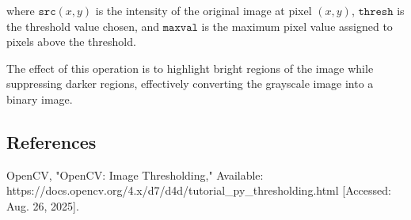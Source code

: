 \documentclass[10pt,twocolumn,letterpaper]{article}
\begin{document}
where $\texttt{src}(x,y)$ is the intensity of the original image at
pixel $(x,y)$, $\texttt{thresh}$ is the threshold value chosen, and
$\texttt{maxval}$ is the maximum pixel value assigned to pixels above
the threshold.

The effect of this operation is to highlight bright regions of the
image while suppressing darker regions, effectively converting the
grayscale image into a binary image.

\subsection{References}
\begin{thebibliography}{1}
OpenCV, "OpenCV: Image Thresholding," Available: 
https://docs.opencv.org/4.x/d7/d4d/tutorial\_py\_thresholding.html [Accessed: Aug. 26, 2025].
\end{thebibliography}
\end{document}
